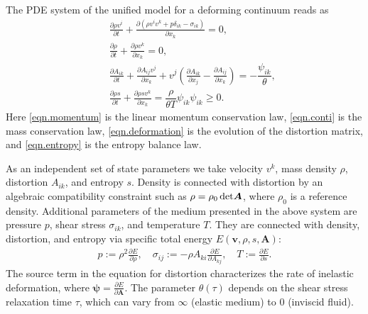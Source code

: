 \documentclass[3p,times,table]{article}
\renewcommand{\AA}{{\bm{A}}}
\newcommand{\vv}{{\bm{v}}}
\begin{document}
The PDE system of the unified model for a deforming continuum reads as
\begin{subequations}\label{eqn.HPR}
\begin{eqnarray} 
	&&\displaystyle\frac{\partial \rho v^i}{\partial t}+\frac{\partial 
		\left(\rho v^i v^k + p \delta_{ik} - \sigma_{ik} \right)}{\partial x_k}=0, 
	\label{eqn.momentum}\\[2mm]
	&& \frac{\partial \rho}{\partial t}+\frac{\partial \rho v^k}{\partial 
	x_k}=0,\label{eqn.conti}\\[2mm]
	&&\displaystyle\frac{\partial A_{i k}}{\partial t}+\frac{\partial A_{ij} 
		v^j}{\partial x_k}+v^j\left(\frac{\partial A_{ik}}{\partial 
		x_j}-\frac{\partial A_{ij}}{\partial x_k}\right)
	=-\dfrac{ \psi_{ik} }{\theta},\label{eqn.deformation}\\[2mm]
	&&\displaystyle\frac{\partial \rho s}{\partial t}+\frac{\partial \rho 
		s v^k }{\partial x_k}=\dfrac{\rho}{\theta T} 
	\psi_{ik} \psi_{ik} \geq0. 
	\label{eqn.entropy}
\end{eqnarray}
\end{subequations}
Here \eqref{eqn.momentum} is the linear momentum conservation law, 
\eqref{eqn.conti} 
is the mass conservation law, \eqref{eqn.deformation} is the evolution of the
distortion matrix, and \eqref{eqn.entropy} is the entropy balance law.

As an independent set of state parameters we take 
velocity $v^k$, mass density $\rho$, distortion $A_{ik}$, and entropy $s$.
Density is connected with distortion  by an algebraic compatibility constraint such as 
$\rho=\rho_0 \det\hspace{-0.6mm}\AA$, where $\rho_0$ is a reference density.
Additional parameters of the medium presented in the above system are 
pressure $p$, shear stress $\sigma_{ik}$, and temperature $T$. They are 
connected with density, distortion, and entropy via specific total 
energy 
$E(\vv,\rho,s,\AA)$:
\begin{align}
p:=\rho^2\frac{\partial E}{\partial \rho}, \quad 
\sigma_{ij} :=-\rho A_{ki}\frac{\partial E}{\partial A_{kj}}, \quad 
T:=\frac{\partial E}{\partial s}.
\end{align}
The source term in the equation for distortion characterizes the rate of inelastic deformation,
where $\bm{\psi}=\frac{\partial E}{\partial \AA}$.
The parameter $\theta(\tau)$ depends on the shear stress relaxation time $\tau$, which can vary from $\infty$ (elastic medium) to $0$ (inviscid fluid).
\end{document}
